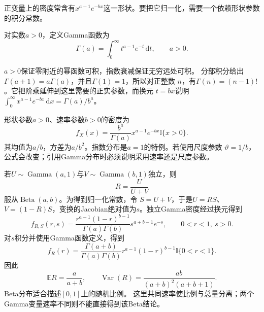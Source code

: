 正变量上的密度常含有\(x^{a-1}e^{-bx}\)这一形状。要把它归一化，需要一个依赖形状参数的积分常数。
\begin{definition}[Gamma函数]
  \label{def:probability-gamma-function}
对实数\(a>0\)，定义Gamma函数为
\begin{equation}
  \Gamma(a)=\int_0^\infty t^{a-1}e^{-t}\,\mathrm dt,
  \qquad a>0.
  \label{eq:probability-gamma-function}
\end{equation}
\end{definition}
\(a>0\)保证零附近的幂函数可积，指数衰减保证无穷远处可积。
分部积分给出\(\Gamma(a+1)=a\Gamma(a)\)，并且\(\Gamma(1)=1\)，所以对正整数
\(n\)，有\(\Gamma(n)=(n-1)!\)。它把阶乘延伸到这里需要的正实参数，而换元
\(t=bx\)说明\(\int_0^\infty x^{a-1}e^{-bx}\,\mathrm dx=\Gamma(a)/b^a\)。

形状参数\(a>0\)、速率参数\(b>0\)的密度为
\[ f_X(x)
  =\frac{b^a}{\Gamma(a)}x^{a-1}e^{-bx}\mathbb{I}\{x>0\}. \]
其均值为\(a/b\)，方差为\(a/b^2\)。指数分布是\(a=1\)的特例。若使用尺度参数
\(\vartheta=1/b\)，公式会改变；引用Gamma分布时必须说明采用速率还是尺度参数。

若\(U\sim\operatorname{Gamma}(a,1)\)与\(V\sim\operatorname{Gamma}(b,1)\)独立，则
\[ R=\frac{U}{U+V} \]
服从\(\operatorname{Beta}(a,b)\)。为得到归一化常数，令
\(S=U+V\)，于是\(U=RS\)、\(V=(1-R)S\)，变换的Jacobian绝对值为\(s\)。独立Gamma密度经过换元得到
\[
  f_{R,S}(r,s)
  =
  \frac{r^{a-1}(1-r)^{b-1}}{\Gamma(a)\Gamma(b)}
  s^{a+b-1}e^{-s},
  \qquad 0<r<1,\ s>0.
\]
对\(s\)积分并使用Gamma函数定义，得到
\[
  f_R(r)
  =
  \frac{\Gamma(a+b)}{\Gamma(a)\Gamma(b)}
  r^{a-1}(1-r)^{b-1}\mathbb{I}\{0<r<1\}.
\]
因此
\[
  \mathbb{E}R=\frac{a}{a+b},\qquad
  \operatorname{Var}(R)=
  \frac{ab}{(a+b)^2(a+b+1)}.
\]
Beta分布适合描述\([0,1]\)上的随机比例。
这里共同速率使比例与总量分离；两个Gamma变量速率不同则不能直接得到该Beta结论。

